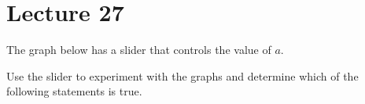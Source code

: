 \documentclass{ximera}
\begin{document}
\section{Lecture 27}

\begin{problem}\label{prob:160hom11prob5}  
 The graph below has a slider that controls the value of $a$. 
  \begin{center} 
\end{center}
Use the slider to experiment with the graphs and determine which of the following statements is true.
\begin{multipleChoice}  
\end{multipleChoice}  
\end{problem}  
  
\end{document}

